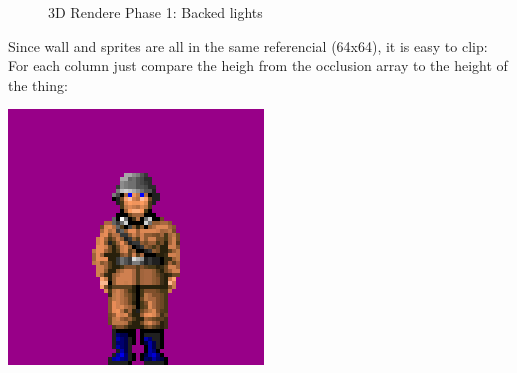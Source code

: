   \begin{figure}[H]
\centering
 
 \caption{3D Rendere Phase 1: Backed lights} \label{fig:backee_lights}
 \end{figure}


\par
Since wall and sprites are all in the same referencial (64x64), it is easy to clip: For each column just compare the heigh from the occlusion array to the height of the thing:\\
\par
  \begin{minipage}{.5\textwidth}
     \includegraphics[width=\textwidth]{imgs/guard_sprite.png}
  \end{minipage}
